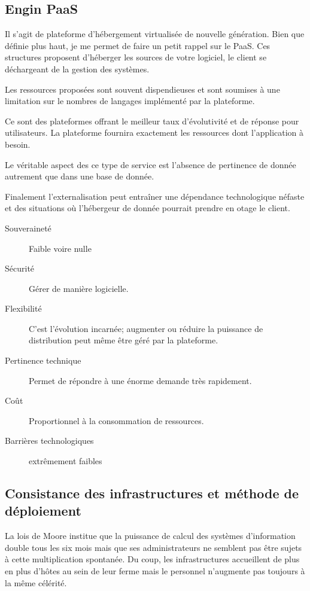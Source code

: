 \documentclass[11pt, a4paper ]{article}
\begin{document}
\begin{spacing}{1.5}
			\subsection{Engin PaaS}

Il s'agit de plateforme d'hébergement virtualisée de nouvelle génération.  Bien que définie plus haut, je me permet de faire un petit rappel sur le PaaS. Ces structures proposent d'héberger les sources de votre logiciel, le client se déchargeant de la gestion des systèmes.

Les ressources proposées sont souvent dispendieuses et sont soumises à une limitation sur le nombres de langages implémenté par la plateforme.

Ce sont des plateformes offrant le meilleur taux d'évolutivité et de réponse pour utilisateurs. La plateforme fournira exactement les ressources dont l'application à besoin.

Le véritable aspect des ce type de service est l'absence de pertinence de donnée autrement que dans une base de donnée.

Finalement l'externalisation peut entraîner une dépendance technologique néfaste et des situations où l'hébergeur de donnée pourrait prendre en otage le client.


\begin{description}
	\item[Souveraineté ]
Faible voire nulle
	\item[Sécurité]
Gérer de manière logicielle.
	\item[Flexibilité]
C'est l'évolution incarnée; augmenter ou réduire la puissance de distribution peut même être géré par la plateforme.
	\item[Pertinence technique]
 Permet de répondre à une énorme demande très rapidement.
	\item[Coût]
Proportionnel à la consommation de ressources.
	\item[Barrières technologiques]
	extrêmement faibles
\end{description}

			\subsection{Consistance des infrastructures et méthode de déploiement}

La lois de Moore institue que la puissance de calcul des systèmes d'information double tous les six mois mais que ses administrateurs ne semblent pas être sujets à cette multiplication spontanée. Du coup, les infrastructures accueillent de plus en plus d'hôtes au sein de leur ferme mais le personnel n'augmente pas toujours à la même célérité.


\end{spacing}
\end{document}
